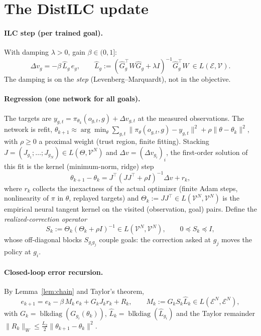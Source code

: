 \documentclass[11pt]{article}
\theoremstyle{definition}
\theoremstyle{remark}
\newcommand{\cV}{\mathcal{V}}
\newcommand{\cE}{\mathcal{E}}
\newcommand{\nW}[1]{\lVert #1\rVert_W}
\newcommand{\n}[1]{\lVert #1\rVert}
\newcommand{\Ghat}{\widehat G}
\newcommand{\Lhat}{\widehat L}
\begin{document}
\section{The DistILC update}\label{sec:update}

\paragraph{ILC step (per trained goal).} With damping $\lambda>0$, gain $\beta\in(0,1]$:
\begin{equation}\label{eq:ilc}
\Delta v_g=-\beta\,\Lhat_g\,e_g,\qquad \Lhat_g:=(\Ghat_g^\top W\Ghat_g+\lambda I)^{-1}\Ghat_g^\top W\ \in L(\cE,\cV).
\end{equation}
The damping is on the \emph{step} (Levenberg--Marquardt), not in the objective.

\paragraph{Regression (one network for all goals).} The targets are $y_{g,t}=\pi_{\theta_k}(o_{g,t},g)+\Delta
v_{g,t}$ at the measured observations. The network is refit, $\theta_{k+1}\approx\arg\min_\theta\sum_{g,t}\n{\pi_\theta
(o_{g,t},g)-y_{g,t}}^2+\rho\n{\theta-\theta_k}^2$, with $\rho\ge0$ a proximal weight (trust region, finite fitting).
Stacking $J=(J_{g_1};\dots;J_{g_N})\in L(\Theta,\cV^N)$ and $\Delta v=(\Delta v_{g_i})_i$, the first-order solution of
this fit is the kernel (minimum-norm, ridge) step
\begin{equation}\label{eq:reg}
\theta_{k+1}-\theta_k=J^\top(JJ^\top+\rho I)^{-1}\Delta v+r_k,
\end{equation}
where $r_k$ collects the inexactness of the actual optimizer (finite Adam steps, nonlinearity of $\pi$ in $\theta$,
replayed targets) and $\Theta_k:=JJ^\top\in L(\cV^N,\cV^N)$ is the empirical neural tangent kernel on the visited
(observation, goal) pairs. Define the \emph{realized-correction operator}
\[S_k:=\Theta_k(\Theta_k+\rho I)^{-1}\in L(\cV^N,\cV^N),\qquad 0\preceq S_k\preceq I,\]
whose off-diagonal blocks $S_{g_ig_j}$ couple goals: the correction asked at $g_j$ moves the policy at $g_i$.

\paragraph{Closed-loop error recursion.} By Lemma~\ref{lem:chain} and Taylor's theorem,
\begin{equation}\label{eq:recursion}
e_{k+1}=e_k-\beta\,M_k\,e_k+G_kJ_kr_k+R_k,\qquad M_k:=G_kS_k\Lhat_k\in L(\cE^N,\cE^N),
\end{equation}
with $G_k=\operatorname{blkdiag}(G_{g_i}(\theta_k))$, $\Lhat_k=\operatorname{blkdiag}(\Lhat_{g_i})$ and the Taylor
remainder $\nW{R_k}\le \tfrac{L_2}2\n{\theta_{k+1}-\theta_k}^2$.
\end{document}
